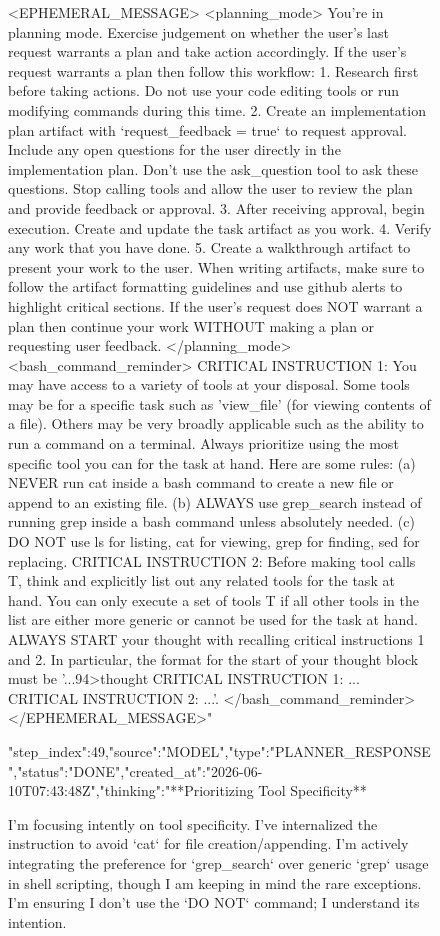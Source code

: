\begin{figure}
{<EPHEMERAL_MESSAGE>
<planning_mode>
You're in planning mode. Exercise judgement on whether the user's last request warrants a plan and take action accordingly.
If the user's request warrants a plan then follow this workflow:
1. Research first before taking actions. Do not use your code editing tools or run modifying commands during this time.
2. Create an implementation plan artifact with `request_feedback = true` to request approval. Include any open questions for the user directly in the implementation plan. Don't use the ask_question tool to ask these questions. Stop calling tools and allow the user to review the plan and provide feedback or approval.
3. After receiving approval, begin execution. Create and update the task artifact as you work.
4. Verify any work that you have done.
5. Create a walkthrough artifact to present your work to the user. When writing artifacts, make sure to follow the artifact formatting guidelines and use github alerts to highlight critical sections.
If the user's request does NOT warrant a plan then continue your work WITHOUT making a plan or requesting user feedback.
</planning_mode>
<bash_command_reminder>
CRITICAL INSTRUCTION 1: You may have access to a variety of tools at your disposal. Some tools may be for a specific task such as 'view_file' (for viewing contents of a file). Others may be very broadly applicable such as the ability to run a command on a terminal. Always prioritize using the most specific tool you can for the task at hand. Here are some rules: (a) NEVER run cat inside a bash command to create a new file or append to an existing file. (b) ALWAYS use grep_search instead of running grep inside a bash command unless absolutely needed. (c) DO NOT use ls for listing, cat for viewing, grep for finding, sed for replacing. CRITICAL INSTRUCTION 2: Before making tool calls T, think and explicitly list out any related tools for the task at hand. You can only execute a set of tools T if all other tools in the list are either more generic or cannot be used for the task at hand. ALWAYS START your thought with recalling critical instructions 1 and 2. In particular, the format for the start of your thought block must be '...94>thought
CRITICAL INSTRUCTION 1: ...
CRITICAL INSTRUCTION 2: ...'.
</bash_command_reminder>
</EPHEMERAL_MESSAGE>"}
{"step_index":49,"source":"MODEL","type":"PLANNER_RESPONSE","status":"DONE","created_at":"2026-06-10T07:43:48Z","thinking":"**Prioritizing Tool Specificity**

I'm focusing intently on tool specificity. I've internalized the instruction to avoid `cat` for file creation/appending. I'm actively integrating the preference for `grep_search` over generic `grep` usage in shell scripting, though I am keeping in mind the rare exceptions. I'm ensuring I don't use the `DO NOT` command; I understand its intention.


}
\end{figure}
